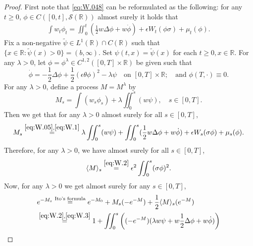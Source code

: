 \documentclass[12pt,a4paper]{amsart}
\numberwithin{equation}{section}
\theoremstyle{plain}
\theoremstyle{remark}
\begin{document}
\begin{proof}
	First note that \eqref{eq:W.048} can be reformulated as the following: 
	for any $t\geq 0$, $\phi \in C([0,t], \mathscr S(\mathbb R))$ almost surely it holds that 
	\begin{equation} \label{eq:W.05}\begin{multlined}
	\int w_t\phi_t  = \iint_0^t (\frac{1}{2}w\Delta\phi + w \dot \phi ) + \epsilon W_t(\phi\sigma) + \mu_t(\phi).
	\end{multlined} \end{equation}
	Fix a non-negative $\tilde \psi \in L^1(\mathbb R) \cap C(\mathbb R)$ such that $\{x\in \mathbb R: \tilde \psi(x)>0\}=(b, \infty)$.
	Set $\psi(t,x) = \tilde \psi (x)$ for each $t\geq 0, x\in \mathbb R$.
	For any $\lambda > 0$, let $\phi = \phi^{\lambda} \in C^{1,2}([0,T] \times \mathbb R)$ be given such that
	\begin{equation} \label{eq:W.06}
	\dot \phi =- \frac{1}{2}\Delta \phi+  \frac{1}{2}(\epsilon\theta \phi)^2  - \lambda \psi \quad \text{on~} [0,T]\times \mathbb R; \quad \text{and~} \phi(T, \cdot)\equiv 0.
	\end{equation}	
	For any $\lambda > 0$, define a process $M=M^{\lambda}$ by
	\begin{equation} \label{eq:W.1}
	M_s
	= \int (w_s \phi_s) + \lambda \iint_0^s (w \psi), 
	\quad s \in [0,T].
	\end{equation}
	Then we get that for any $\lambda > 0$ almost surely for all $s\in [0,T]$,
	\begin{equation} \label{eq:W.2}
	M_s
	\overset{\eqref{eq:W.05}, \eqref{eq:W.1}}= \lambda \iint_0^s (w \psi) + \iint_0^s (\frac{1}{2}w\Delta\phi + w \dot \phi) + \epsilon W_s(\sigma\phi) + \mu_s(\phi).
	\end{equation}
	Therefore, for any $\lambda > 0$, we have almost surely for all $s\in [0,T]$,
	\begin{equation} \label{eq:W.3}
	\langle M \rangle_s
	\overset{\eqref{eq:W.2}}= \epsilon^2 \iint_0^s (\sigma \phi)^2.
	\end{equation}
	Now, for any $\lambda > 0$ we get almost surely for any $s\in [0,T]$,
	\begin{align}
	& e^{-M_s} 
	\overset{\text{Ito's formula}}= e^{- M_0} + M_s(-e^{-M}) + \frac{1}{2} \langle M\rangle_s( e^{-M}) 
	\\&\begin{multlined}
	\overset{\eqref{eq:W.2}, \eqref{eq:W.3}}= 1 +  \iint_0^s \left((-e^{- M}) (\lambda w \psi +w \frac{1}{2} \Delta\phi + w\dot \phi)\right)

\end{multlined}
\end{align}
\end{proof}
\end{document}
